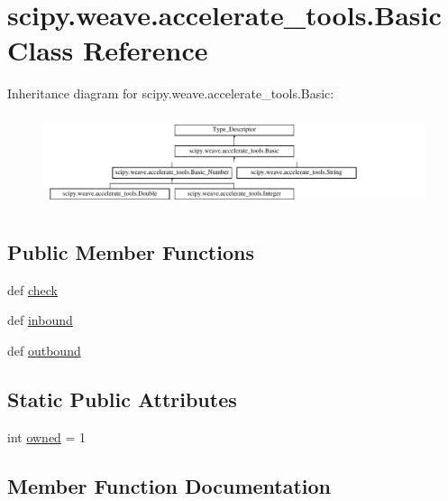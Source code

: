 \hypertarget{classscipy_1_1weave_1_1accelerate__tools_1_1Basic}{}\section{scipy.\+weave.\+accelerate\+\_\+tools.\+Basic Class Reference}
\label{classscipy_1_1weave_1_1accelerate__tools_1_1Basic}
Inheritance diagram for scipy.\+weave.\+accelerate\+\_\+tools.\+Basic\+:\begin{figure}[H]
\begin{center}
\leavevmode
\includegraphics[height=2.725061cm]{classscipy_1_1weave_1_1accelerate__tools_1_1Basic}
\end{center}
\end{figure}
\subsection*{Public Member Functions}
\begin{DoxyCompactItemize}
\item 
def \hyperlink{classscipy_1_1weave_1_1accelerate__tools_1_1Basic_aefcd554a0f8d6e9a7ed5906814e460a3}{check}
\item 
def \hyperlink{classscipy_1_1weave_1_1accelerate__tools_1_1Basic_adde8ebc9c10a88a9d0547f0ae1564c6b}{inbound}
\item 
def \hyperlink{classscipy_1_1weave_1_1accelerate__tools_1_1Basic_a1c60f3551377275852692e204f1210ec}{outbound}
\end{DoxyCompactItemize}
\subsection*{Static Public Attributes}
\begin{DoxyCompactItemize}
\item 
int \hyperlink{classscipy_1_1weave_1_1accelerate__tools_1_1Basic_a0fd23dd1de655829b8a5cc5aefbcd76d}{owned} = 1
\end{DoxyCompactItemize}


\subsection{Member Function Documentation}
\hypertarget{classscipy_1_1weave_1_1accelerate__tools_1_1Basic_aefcd554a0f8d6e9a7ed5906814e460a3}{}
